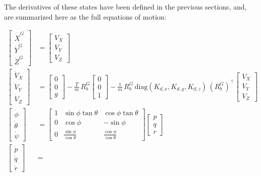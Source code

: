 \documentclass[conf]{new-aiaa}
\begin{document}
The derivatives of these states have been defined in the previous sections, and, are summarized here as the full equations of motion:

\begin{align*}
\begin{bmatrix}\dot X^G\\\dot Y^G\\\dot Z^G\end{bmatrix} &= \begin{bmatrix}V_X\\V_Y\\V_Z\end{bmatrix}\\[6pt]
\begin{bmatrix}\dot V_X\\\dot V_Y\\\dot V_Z\end{bmatrix} &=
\begin{bmatrix}0\\0\\g\end{bmatrix}
-\frac{T}{m}\,R_b^G\begin{bmatrix}0\\0\\1\end{bmatrix}
-\frac{1}{m}\,R_b^G\,\mathrm{diag}(K_{d,x},K_{d,y},K_{d,z})\,(R_b^G)^{\!\top}\begin{bmatrix}V_X\\V_Y\\V_Z\end{bmatrix}\\[6pt]
\begin{bmatrix}\dot\phi\\\dot\theta\\\dot\psi\end{bmatrix} &=
\begin{bmatrix}1&\sin\phi\tan\theta&\cos\phi\tan\theta\\0&\cos\phi&-\sin\phi\\0&\frac{\sin\phi}{\cos\theta}&\frac{\cos\phi}{\cos\theta}\end{bmatrix}
\begin{bmatrix}p\\q\\r\end{bmatrix}\\[6pt]
\begin{bmatrix}\dot p\\\dot q\\\dot r\end{bmatrix} &=

\end{align*}
\end{document}
